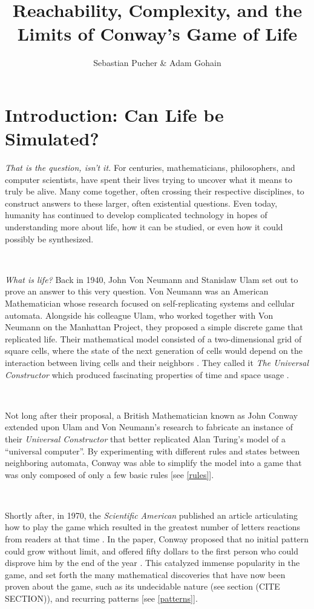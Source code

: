 \documentclass{article}
\title{Reachability, Complexity, and the Limits of Conway's Game of Life}
\author{Sebastian Pucher \& Adam Gohain}
\theoremstyle{definition}
\theoremstyle{plain}
\theoremstyle{plain}
\begin{document}
\maketitle

\tableofcontents

\newpage

\section{Introduction: Can Life be Simulated?}
  \textit{    That is the question, isn't it.} For centuries, mathematicians, philosophers, and computer scientists, have spent their lives trying to uncover what it means to truly be alive. Many come together, often crossing their respective disciplines, to construct answers to these larger, often existential questions. Even today, humanity has continued to develop complicated technology in hopes of understanding more about life, how it can be studied, or even how it could possibly be synthesized.

\

\textit{What is life?} Back in 1940, John Von Neumann and Stanislaw Ulam set out to prove an answer to this very question. Von Neumann was an American Mathematician whose research focused on self-replicating systems and cellular automata. Alongside his colleague Ulam, who worked together with Von Neumann on the Manhattan Project, they proposed a simple discrete game that replicated life. Their mathematical model consisted of a two-dimensional grid of square cells, where the state of the next generation of cells would depend on the interaction between living cells and their neighbors \cite{Beginning_Life_2006}. They called it \textit{The Universal Constructor} which produced fascinating properties of time and space usage \cite{Freitas_2004}.

\

Not long after their proposal, a British Mathematician known as John Conway extended upon Ulam and Von Neumann’s research to fabricate an instance of their \textit{Universal Constructor} that better replicated Alan Turing’s model of a “universal computer”. By experimenting with different rules and states between neighboring automata, Conway was able to simplify the model into a game that was only composed of only a few basic rules \cite{Beginning_Life_2006} [see \ref{rules}]. 

\

Shortly after, in 1970, the \textit{Scientific American} published an article articulating how to play the game which resulted in the greatest number of letters reactions from readers at that time \cite{Izhikevich_Conway_Seth}. In the paper, Conway proposed that no initial pattern could grow without limit, and offered fifty dollars to the first person who could disprove him by the end of the year \cite{math-games}. This catalyzed immense popularity in the game, and set forth the many mathematical discoveries that have now been proven about the game, such as its undecidable nature (see section (CITE SECTION)), and recurring patterns [see \ref{patterns}].
\end{document}
